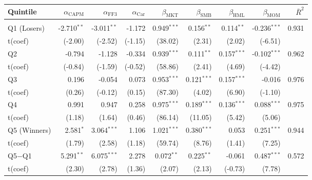 \begin{table}[!htbp]
{\tablefont
\setlength{\tabcolsep}{2pt}%
\begin{tabular*}{\linewidth}{@{\extracolsep{\fill}}lrrrrrrrr}
\toprule
Quintile & $\alpha_{\text{CAPM}}$ & $\alpha_{\text{FF3}}$ & $\alpha_{\text{Car}}$ & $\beta_{\text{MKT}}$ & $\beta_{\text{SMB}}$ & $\beta_{\text{HML}}$ & $\beta_{\text{MOM}}$ & $\bar{R}^2$\\
\midrule
\addlinespace[0.3em]
\multicolumn{9}{l}{Active --- EW}\\
\hspace{1em}Q1 (Losers) & -2.710$^{**}$ & -3.011$^{**}$ & -1.172 & 0.949$^{***}$ & 0.156$^{**}$ & 0.114$^{**}$ & -0.236$^{***}$ & 0.931\\
\hspace{1em}t(coef) & (-2.00) & (-2.52) & (-1.15) & (38.02) & (2.31) & (2.02) & (-6.51) & \\
\hspace{1em}Q2 & -0.794 & -1.128 & -0.334 & 0.939$^{***}$ & 0.111$^{**}$ & 0.157$^{***}$ & -0.102$^{***}$ & 0.962\\
\hspace{1em}t(coef) & (-0.84) & (-1.59) & (-0.52) & (58.86) & (2.41) & (4.69) & (-4.42) & \\
\hspace{1em}Q3 & 0.196 & -0.054 & 0.073 & 0.953$^{***}$ & 0.121$^{***}$ & 0.157$^{***}$ & -0.016 & 0.976\\
\hspace{1em}t(coef) & (0.26) & (-0.12) & (0.15) & (87.30) & (4.02) & (6.90) & (-1.10) & \\
\hspace{1em}Q4 & 0.991 & 0.947 & 0.258 & 0.975$^{***}$ & 0.189$^{***}$ & 0.136$^{***}$ & 0.088$^{***}$ & 0.975\\
\hspace{1em}t(coef) & (1.18) & (1.64) & (0.46) & (86.14) & (11.05) & (5.42) & (5.06) & \\
\hspace{1em}Q5 (Winners) & 2.581$^{*}$ & 3.064$^{***}$ & 1.106 & 1.021$^{***}$ & 0.380$^{***}$ & 0.053 & 0.251$^{***}$ & 0.944\\
\hspace{1em}t(coef) & (1.79) & (2.58) & (1.18) & (59.74) & (8.76) & (1.41) & (7.25) & \\
\hspace{1em}Q5$-$Q1 & 5.291$^{**}$ & 6.075$^{***}$ & 2.278 & 0.072$^{**}$ & 0.225$^{**}$ & -0.061 & 0.487$^{***}$ & 0.572\\
\hspace{1em}t(coef) & (2.30) & (2.78) & (1.36) & (2.07) & (2.13) & (-0.73) & (7.78) & \\

\end{tabular*}}
\end{table}
